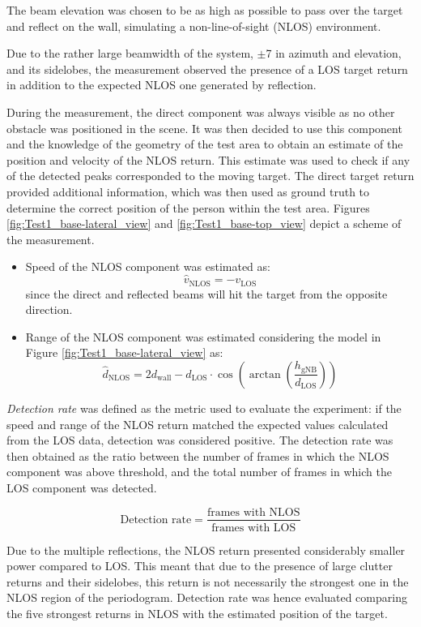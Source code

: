 The beam elevation was chosen to be as high as possible to pass over the target and reflect on the wall, simulating a non-line-of-sight (NLOS) environment.

Due to the rather large beamwidth of the system, $\pm$7\textdegree\hspace{1pt} in azimuth and elevation, and its sidelobes, the measurement observed the presence of a LOS target return in addition to the expected NLOS one generated by reflection.

During the measurement, the direct component was always visible as no other obstacle was positioned in the scene. It was then decided to use this component and the knowledge of the geometry of the test area to obtain an estimate of the position and velocity of the NLOS return. This estimate was used to check if any of the detected peaks corresponded to the moving target.
The direct target return provided additional information, which was then used as ground truth to determine the correct position of the person within the test area.
Figures \ref{fig:Test1_base-lateral_view} and \ref{fig:Test1_base-top_view} depict a scheme of the measurement.

\begin{itemize}
	\item Speed of the NLOS component was estimated as:
	$$ \hat{v}_{\text{NLOS}} = -v_{\text{LOS}}$$
	since the direct and reflected beams will hit the target from the opposite direction.
	\item Range of the NLOS component was estimated considering the model in Figure \ref{fig:Test1_base-lateral_view} as:
	$$ \hat{d}_{\text{NLOS}} = 2 d_{\text{wall}} - d_{\text{LOS}}\cdot \cos{(\arctan{\left(\frac{h_{\text{gNB}}}{d_{\text{LOS}}}\right)})}$$
\end{itemize}


\textit{Detection rate} was defined as the metric used to evaluate the experiment: if the speed and range of the NLOS return matched the expected values calculated from the LOS data, detection was considered positive.
The detection rate was then obtained as the ratio between the number of frames in which the NLOS component was above threshold, and the total number of frames in which the LOS component was detected.


\begin{equation*}
	\text{Detection rate} = \frac{\text{frames with NLOS}}{\text{frames with LOS}}
\end{equation*}

Due to the multiple reflections, the NLOS return presented considerably smaller power compared to LOS.
This meant that due to the presence of large clutter returns and their sidelobes, this return is not necessarily the strongest one in the NLOS region of the periodogram.
Detection rate was hence evaluated comparing the five strongest returns in NLOS with the estimated position of the target.

